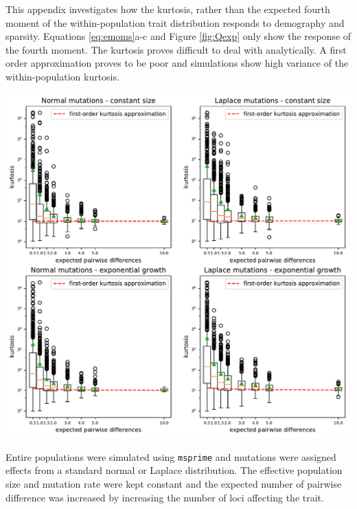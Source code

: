This appendix investigates how the kurtosis, rather than the expected fourth
moment of the within-population trait distribution responds to demography and
sparsity. Equations \eqref{eq:emoms}a-c and Figure \ref{fig:Qexp} only show the
response of the fourth moment. The kurtosis proves difficult to deal with
analytically. A first order approximation proves to be poor and simulations show
high variance of the within-population kurtosis. 
\begin{center}
  \centering \includegraphics[width=\textwidth]{figures/kurt_sim.pdf}
  \label{fig:kurtsim}
\end{center}

Entire populations were simulated using \texttt{msprime} \citep{Kelleher2015}
and mutations were assigned effects from a standard normal or Laplace
distribution. The effective population size and mutation rate were kept constant
and the expected number of pairwise difference was increased by increasing the
number of loci affecting the trait.

